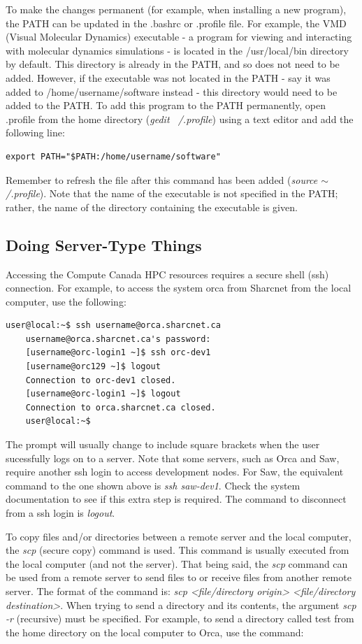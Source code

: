 \documentclass[12pt]{article}
\begin{document}
\quad To make the changes permanent (for example, when installing a new program), the PATH can be updated in the .bashrc or .profile file. For example, the VMD (Visual Molecular Dynamics) executable - a program for viewing and interacting with molecular dynamics simulations - is located in the /usr/local/bin directory by default. This directory is already in the PATH, and so does not need to be added. However, if the executable was not located in the PATH - say it was added to /home/username/software instead - this directory would need to be added to the PATH. To add this program to the PATH permanently, open .profile from the home directory (\textit{gedit ~/.profile}) using a text editor and add the following line:
\begin{lstlisting}[numbers=none]
	export PATH="$PATH:/home/username/software"
\end{lstlisting}
Remember to refresh the file after this command has been added (\textit{source $\sim$/.profile}). Note that the name of the executable is not specified in the PATH; rather, the name of the directory containing the executable is given. 

\subsection{Doing Server-Type Things}
\quad\enskip\quad Accessing the Compute Canada HPC resources requires a secure shell (ssh) connection. For example, to access the system orca from Sharcnet from the local computer, use the following:
\begin{lstlisting}[numbers=none]
	user@local:~$ ssh username@orca.sharcnet.ca
	username@orca.sharcnet.ca's password:
	[username@orc-login1 ~]$ ssh orc-dev1
	[username@orc129 ~]$ logout
	Connection to orc-dev1 closed.	
	[username@orc-login1 ~]$ logout
	Connection to orca.sharcnet.ca closed.
	user@local:~$
\end{lstlisting}
The prompt will usually change to include square brackets when the user sucessfully logs on to a server. Note that some servers, such as Orca and Saw, require another ssh login to access development nodes. For Saw, the equivalent command to the one shown above is \textit{ssh saw-dev1}. Check the system documentation to see if this extra step is required. The command to disconnect from a ssh login is \textit{logout}.

\quad To copy files and/or directories between a remote server and the local computer, the \textit{scp} (secure copy) command is used. This command is usually executed from the local computer (and not the server). That being said, the \textit{scp} command can be used from a remote server to send files to or receive files from another remote server. The format of the command is: \textit{scp <file/directory origin> <file/directory destination>}. When trying to send a directory and its contents, the argument \textit{scp -r} (recursive) must be specified. For example, to send a directory called test from the home directory on the local computer to Orca, use the command:
\end{document}
